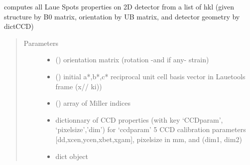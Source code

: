 \documentclass[letterpaper,10pt,english]{sphinxmanual}
\begin{document}
\begin{fulllineitems}
\label{\detokenize{Simulation_Module:LaueTools.lauecore.calcSpots_fromHKLlist}}
computes all Laue Spots properties on 2D detector from a list of hkl
(given structure by B0 matrix, orientation by UB matrix, and detector geometry by dictCCD)
\begin{quote}\begin{description}
\item[{Parameters}] \leavevmode\begin{itemize}
\item {} 
 (\sphinxstyleliteralemphasis{\sphinxupquote{)}}) \textendash{} orientation matrix (rotation -and if any- strain)

\item {} 
 (\sphinxstyleliteralemphasis{\sphinxupquote{)}}) \textendash{} initial a*,b*,c* reciprocal unit cell basis vector in Lauetools frame (x// ki))

\item {} 
 (\sphinxstyleliteralemphasis{\sphinxupquote{ (}}\sphinxstyleliteralemphasis{\sphinxupquote{,}}\sphinxstyleliteralemphasis{\sphinxupquote{)}}) \textendash{} array of Miller indices

\item {} 
 \textendash{} dictionnary of CCD properties (with key ‘CCDparam’, ‘pixelsize’,’dim’)
for ‘ccdparam’ 5 CCD calibration parameters {[}dd,xcen,ycen,xbet,xgam{]}, pixelsize in mm, and (dim1, dim2)

\item {} 
 \textendash{} dict object


\end{itemize}
\end{description}
\end{quote}
\end{fulllineitems}
\end{document}
